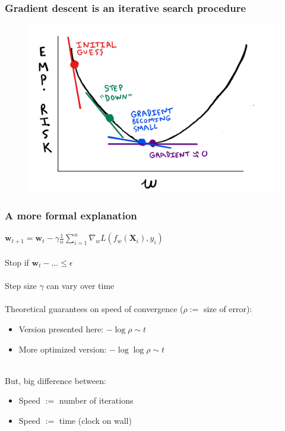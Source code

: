 \documentclass{beamer}
\begin{document}
\begin{frame}
	\frametitle{Gradient descent is an iterative search procedure}
	\begin{figure}[h]
	\centering
	\includegraphics[scale=0.33]{Sketch}
	\end{figure}
\end{frame}

\begin{frame}
	\frametitle{A more formal explanation}

	$\mathbf{w}_{t+1} = \mathbf{w}_t - \gamma \frac{1}{n}\sum_{i=1}^n
	\nabla_w L(f_w(\mathbf{X}_i), y_i)$ \\~\\

	Stop if $\mathbf{w}_t - \ldots \leq \epsilon$ \\~\\

	Step size $\gamma$ can vary over time \\~\\

	Theoretical guarantees on speed of convergence ($\rho :=$ size of error):
	\begin{itemize}
		\item Version presented here: $ - \log \rho \sim t$
		\item More optimized version: $ - \log \log \rho \sim t$ \\~\\
	\end{itemize}
	
	But, big difference between:
	\begin{itemize}
		\item Speed $:=$ number of iterations
		\item Speed $:=$ time (clock on wall)
	\end{itemize}
\end{frame}
\end{document}
